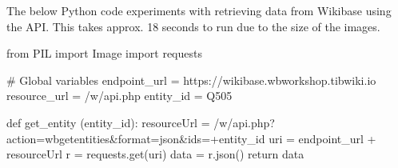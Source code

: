 \documentclass[
  letterpaper,
  DIV=11,
  numbers=noendperiod]{scrreprt}
\newenvironment{Shaded}{\begin{snugshade}}{\end{snugshade}}
\newcommand{\CommentTok}[1]{\textcolor[rgb]{0.37,0.37,0.37}{#1}}
\newcommand{\ControlFlowTok}[1]{\textcolor[rgb]{0.00,0.23,0.31}{#1}}
\newcommand{\ImportTok}[1]{\textcolor[rgb]{0.00,0.46,0.62}{#1}}
\newcommand{\KeywordTok}[1]{\textcolor[rgb]{0.00,0.23,0.31}{#1}}
\newcommand{\NormalTok}[1]{\textcolor[rgb]{0.00,0.23,0.31}{#1}}
\newcommand{\OperatorTok}[1]{\textcolor[rgb]{0.37,0.37,0.37}{#1}}
\newcommand{\StringTok}[1]{\textcolor[rgb]{0.13,0.47,0.30}{#1}}
\begin{document}
The below Python code experiments with retrieving data from Wikibase
using the API. This takes approx. 18 seconds to run due to the size of
the images.

\begin{Shaded}
\begin{Highlighting}[]
\ImportTok{from}\NormalTok{ PIL }\ImportTok{import}\NormalTok{ Image}
\ImportTok{import}\NormalTok{ requests}

\CommentTok{\# Global variables}
\NormalTok{endpoint\_url }\OperatorTok{=} \StringTok{\textquotesingle{}https://wikibase.wbworkshop.tibwiki.io\textquotesingle{}}
\NormalTok{resource\_url }\OperatorTok{=} \StringTok{\textquotesingle{}/w/api.php\textquotesingle{}}
\NormalTok{entity\_id }\OperatorTok{=} \StringTok{\textquotesingle{}Q505\textquotesingle{}}

\KeywordTok{def}\NormalTok{ get\_entity (entity\_id):}
\NormalTok{    resourceUrl }\OperatorTok{=} \StringTok{\textquotesingle{}/w/api.php?action=wbgetentities\&format=json\&ids=\textquotesingle{}}\OperatorTok{+}\NormalTok{entity\_id}
\NormalTok{    uri }\OperatorTok{=}\NormalTok{ endpoint\_url }\OperatorTok{+}\NormalTok{ resourceUrl}
\NormalTok{    r }\OperatorTok{=}\NormalTok{ requests.get(uri)}
\NormalTok{    data }\OperatorTok{=}\NormalTok{ r.json()}
    \ControlFlowTok{return}\NormalTok{ data}


\end{Highlighting}
\end{Shaded}
\end{document}

